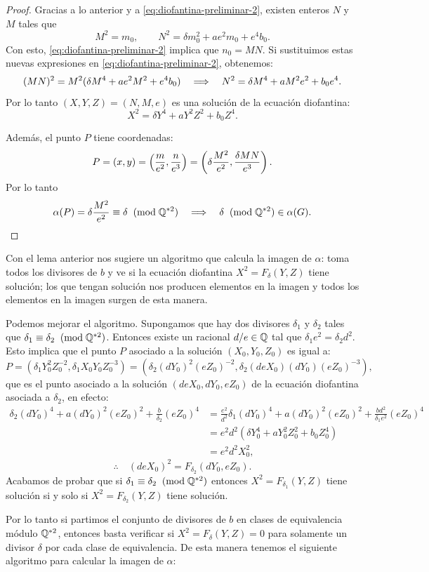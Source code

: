 \begin{proof}
Gracias a lo anterior y a \eqref{eq:diofantina-preliminar-2}, existen enteros $N$ y $M$ tales que
\[
	M^2=m_0,\qquad N^2=\delta m_0^2+ae^2m_0+e^4b_0.
\]
Con esto, \eqref{eq:diofantina-preliminar-2} implica que $n_0=MN$. Si sustituimos estas nuevas expresiones en \eqref{eq:diofantina-preliminar-2}, obtenemos:
\[
	(MN)^2=M^2(\delta M^4+ae^2M^2+e^4b_0)\quad\Longrightarrow\quad N^2=\delta M^4+aM^2e^2+b_0e^4.
\]
Por lo tanto  $(X,Y,Z)=(N,M,e)$ es una solución de la ecuación diofantina:
\[
	X^2=\delta Y^4+aY^2Z^2+b_0 Z^4.
\]

Además, el punto $P$ tiene coordenadas:
\[
	P=(x,y)=\left( \frac{m}{e^2},\frac{n}{e^3} \right)=\left( \delta\frac{M^2}{e^2},\frac{\delta MN}{e^3} \right).
\]
Por lo tanto
\[
	\alpha(P)=\delta\frac{M^2}{e^2}\equiv \delta\;\;(\mathrm{mod}\; \mathbb{Q}^{*2}) \quad\Longrightarrow\quad \delta\;\;(\mathrm{mod}\; \mathbb{Q}^{*2})\in\alpha(G).
\]
\end{proof}

Con el lema anterior nos sugiere un algoritmo que calcula la imagen de $\alpha$: toma todos los divisores de $b$ y ve si la ecuación diofantina $X^2=F_\delta(Y,Z)$ tiene solución; los que tengan solución nos producen elementos en la imagen y todos los elementos en la imagen surgen de esta manera.

Podemos mejorar el algoritmo. Supongamos que hay dos divisores $\delta_1$ y $\delta_2$ tales que $\delta_1\equiv\delta_2\;\;(\mathrm{mod}\; \mathbb{Q}^{*2})$. Entonces existe un racional $d/e\in\mathbb{Q}$ tal que $\delta_1 e^2=\delta_2 d^2$. Esto implica que el punto $P$ asociado a la solución $(X_0,Y_0,Z_0)$ es igual a:
	\[
		P=(\delta_1 Y_0^2Z_0^{-2},\delta_1 X_0Y_0Z_0^{-3})=(\delta_2 (dY_0)^2(eZ_0)^{-2},\delta_2 (deX_0)(dY_0)(eZ_0)^{-3}),
	\]
que es el punto asociado a la solución $(deX_0,dY_0,eZ_0)$ de la ecuación diofantina asociada a $\delta_2$, en efecto:
	\begin{align*}
		\delta_2(d Y_0)^4+a(d Y_0)^2(eZ_0)^2+\frac{b}{\delta_2}(eZ_0)^4
		&=\frac{e^2}{d^2}\delta_1(d Y_0)^4+a(d Y_0)^2(eZ_0)^2+\frac{b d^2}{\delta_1 e^2}(eZ_0)^4\\
		&=e^2d^2 (\delta Y_0^4+aY_0^2 Z_0^2+b_0Z_0^4)\\
		&=e^2d^2X_0^2,
	\end{align*}
	\[
		\therefore\quad (deX_0)^2=F_{\delta_2}(dY_0,eZ_0).
	\]
Acabamos de probar que si $\delta_1\equiv\delta_2\;\;(\mathrm{mod}\; \mathbb{Q}^{*2})$ entonces $X^2=F_{\delta_1}(Y,Z)$ tiene solución si y solo si $X^2=F_{\delta_2}(Y,Z)$ tiene solución.

Por lo tanto si partimos el conjunto de divisores de $b$ en clases de equivalencia módulo $\mathbb{Q}^{*2}$, entonces basta verificar si $X^2=F_\delta(Y,Z)=0$ para solamente un divisor $\delta$ por cada clase de equivalencia. De esta manera tenemos el siguiente algoritmo para calcular la imagen de $\alpha$:

